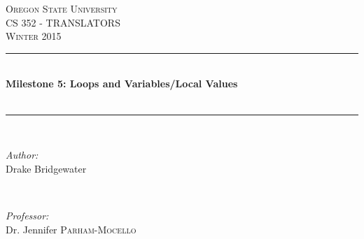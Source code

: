 \documentclass[letterpaper,10pt]{article}
\def\name{Drake Bridgewater }
\def\title{Milestone 5: Loops and Variables/Local Values }
\def\subtitle{}
\def\subject{CS }
\def\courseNumber{352 }
\def\courseName{TRANSLATORS }
\def\courseInfo{Winter 2015 }%
\def\supervisor{Dr. Jennifer \textsc{Parham-Mocello }} %
\begin{document}
\begin{titlepage}

\newcommand{\HRule}{\rule{\linewidth}{0.5mm}} %

\center %
 

\textsc{\LARGE Oregon State University}\\[1.5cm] %
\textsc{\Large \subject \courseNumber - \courseName}\\[0.5cm] %
\textsc{\large \courseInfo}\\[1.5cm] %


\HRule \\[0.4cm]
{ \huge \bfseries \title }\\[0.1cm] %
{\small \textit{\textbf{ \subtitle }}}\\[0.2cm]
\HRule \\[7.5cm]
 

\begin{minipage}{0.4\textwidth}
\begin{flushleft} \large
\emph{Author:}\\
\name
\end{flushleft}
\end{minipage}
~
\begin{minipage}{0.4\textwidth}
\begin{flushright} \large
\emph{Professor:} \\
\supervisor
\end{flushright}
\end{minipage}\\[4cm]



\end{titlepage}
\end{document}
